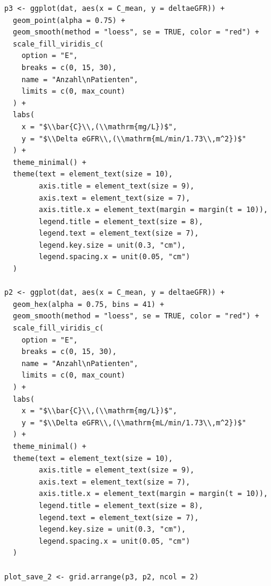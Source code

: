 \documentclass[a4paper,12pt]{article}
\begin{document}
\begin{lstlisting}[caption={Code für Abbildung \ref{fig:abb4}}, label = lst:abb4, style=mystyle, escapeinside=``]
p3 <- ggplot(dat, aes(x = C_mean, y = deltaeGFR)) +
  geom_point(alpha = 0.75) +
  geom_smooth(method = "loess", se = TRUE, color = "red") +
  scale_fill_viridis_c(
    option = "E",
    breaks = c(0, 15, 30),
    name = "Anzahl\nPatienten",
    limits = c(0, max_count)
  ) +
  labs(
    x = "$\\bar{C}\\,(\\mathrm{mg/L})$",
    y = "$\\Delta eGFR\\,(\\mathrm{mL/min/1.73\\,m^2})$"
  ) +
  theme_minimal() +
  theme(text = element_text(size = 10),
        axis.title = element_text(size = 9),
        axis.text = element_text(size = 7),
        axis.title.x = element_text(margin = margin(t = 10)),
        legend.title = element_text(size = 8),
        legend.text = element_text(size = 7),
        legend.key.size = unit(0.3, "cm"),
        legend.spacing.x = unit(0.05, "cm")
  )

p2 <- ggplot(dat, aes(x = C_mean, y = deltaeGFR)) +
  geom_hex(alpha = 0.75, bins = 41) +
  geom_smooth(method = "loess", se = TRUE, color = "red") +
  scale_fill_viridis_c(
    option = "E",
    breaks = c(0, 15, 30),
    name = "Anzahl\nPatienten",
    limits = c(0, max_count)
  ) +
  labs(
    x = "$\\bar{C}\\,(\\mathrm{mg/L})$",
    y = "$\\Delta eGFR\\,(\\mathrm{mL/min/1.73\\,m^2})$"
  ) +
  theme_minimal() +
  theme(text = element_text(size = 10),
        axis.title = element_text(size = 9),
        axis.text = element_text(size = 7),
        axis.title.x = element_text(margin = margin(t = 10)),
        legend.title = element_text(size = 8),
        legend.text = element_text(size = 7),
        legend.key.size = unit(0.3, "cm"),
        legend.spacing.x = unit(0.05, "cm")
  )

plot_save_2 <- grid.arrange(p3, p2, ncol = 2)
\end{lstlisting}

%


\end{document}
